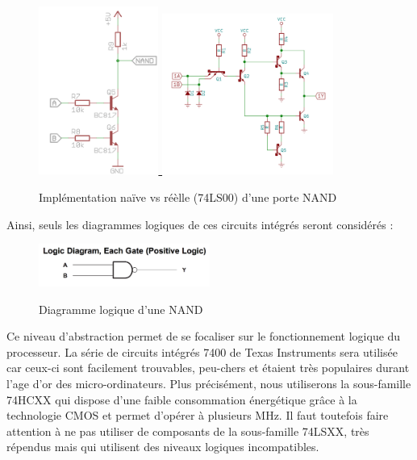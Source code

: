 \documentclass{article}
\begin{document}
    \begin{figure}[ht!]
        \label{fig_NAND}
        \centering
        \href{http://www.justgeek.de/with-a-fistful-of-transistors-1-back-to-the-basics/}{
        \includegraphics[width=0.35\textwidth]{figures/nand.png}
        }
        \href{https://project5474.org}{
            \includegraphics[width=0.5\textwidth]{figures/74LS00.png}
        }
        \caption{Implémentation naïve vs réèlle (74LS00) d'une porte NAND}
    \end{figure}

    Ainsi, seuls les diagrammes logiques de ces circuits intégrés seront considérés :

    \begin{figure}[ht!]
        \label{fig_nand_logic_diagram}
        \centering
        \href{http://www.ti.com/lit/ds/symlink/sn74ls00.pdf}{
        \includegraphics[width=0.5\textwidth]{figures/nand_logic_diagram.png}
        }
        \caption{Diagramme logique d'une NAND}
    \end{figure}

    Ce niveau d'abstraction permet de se focaliser sur le fonctionnement logique du processeur.
    La série de circuits intégrés 7400 de Texas Instruments sera utilisée car ceux-ci sont facilement
    trouvables, peu-chers et étaient très populaires durant l'age d'or des micro-ordinateurs.
    Plus précisément, nous utiliserons la sous-famille 74HCXX qui dispose d'une faible consommation
    énergétique grâce à la technologie CMOS et permet d'opérer à plusieurs MHz.
    Il faut toutefois faire attention à ne pas utiliser de composants de la sous-famille 74LSXX,
    très répendus mais qui utilisent des niveaux logiques incompatibles.
\end{document}
